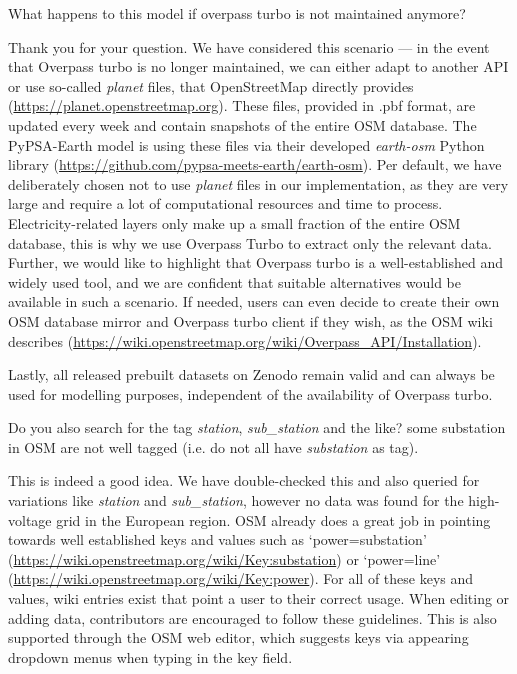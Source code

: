 \documentclass{response}
\begin{document}
\RC What happens to this model if overpass turbo is not maintained anymore? 

\AR Thank you for your question. We have considered this scenario --- in the event that Overpass turbo is no longer maintained, we can either adapt to another API or use so-called \textit{planet} files, that OpenStreetMap directly provides (\href{https://planet.openstreetmap.org}{https://planet.openstreetmap.org}). These files, provided in .pbf format, are updated every week and contain snapshots of the entire OSM database. The PyPSA-Earth model is using these files via their developed \textit{earth-osm} Python library (\href{https://github.com/pypsa-meets-earth/earth-osm}{https://github.com/pypsa-meets-earth/earth-osm}). Per default, we have deliberately chosen not to use \textit{planet} files in our implementation, as they are very large and require a lot of computational resources and time to process. Electricity-related layers only make up a small fraction of the entire OSM database, this is why we use Overpass Turbo to extract only the relevant data. Further, we would like to highlight that Overpass turbo is a well-established and widely used tool, and we are confident that suitable alternatives would be available in such a scenario. If needed, users can even decide to create their own OSM database mirror and Overpass turbo client if they wish, as the OSM wiki describes (\href{https://wiki.openstreetmap.org/wiki/Overpass_API/Installation}{https://wiki.openstreetmap.org/wiki/Overpass\_API/Installation}).

Lastly, all released prebuilt datasets on Zenodo \cite{xiongPrebuiltElectricityNetwork2024} remain valid and can always be used for modelling purposes, independent of the availability of Overpass turbo. 

\RC Do you also search for the tag \textit{station}, \textit{sub\_station} and the like? some substation in OSM are not well tagged (i.e. do not all have \textit{substation} as tag). 

\AR This is indeed a good idea. We have double-checked this and also queried for variations like \textit{station} and \textit{sub\_station}, however no data was found for the high-voltage grid in the European region. OSM already does a great job in pointing towards well established keys and values such as `power=substation' (\href{https://wiki.openstreetmap.org/wiki/Key:substation}{https://wiki.openstreetmap.org/wiki/Key:substation}) or `power=line' (\href{https://wiki.openstreetmap.org/wiki/Key:power}{https://wiki.openstreetmap.org/wiki/Key:power}). For all of these keys and values, wiki entries exist that point a user to their correct usage. When editing or adding data, contributors are encouraged to follow these guidelines. This is also supported through the OSM web editor, which suggests keys via appearing dropdown menus when typing in the key field.
\end{document}

